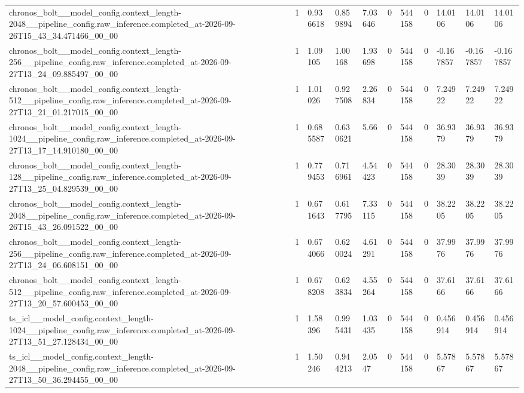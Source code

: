 \begin{tabular}{lllllllllll}
chronos\_bolt\_\_model\_config.context\_length-2048\_\_pipeline\_config.raw\_inference.completed\_at-2026-09-26T15\_43\_34.471466\_00\_00 & 1 & 0.936618 & 0.859894 & 7.03646 & 0 & 544158 & 0 & 14.0106 & 14.0106 & 14.0106 \\
chronos\_bolt\_\_model\_config.context\_length-256\_\_pipeline\_config.raw\_inference.completed\_at-2026-09-27T13\_24\_09.885497\_00\_00 & 1 & 1.09105 & 1.00168 & 1.93698 & 0 & 544158 & 0 & -0.167857 & -0.167857 & -0.167857 \\
chronos\_bolt\_\_model\_config.context\_length-512\_\_pipeline\_config.raw\_inference.completed\_at-2026-09-27T13\_21\_01.217015\_00\_00 & 1 & 1.01026 & 0.927508 & 2.26834 & 0 & 544158 & 0 & 7.24922 & 7.24922 & 7.24922 \\
chronos\_bolt\_\_model\_config.context\_length-1024\_\_pipeline\_config.raw\_inference.completed\_at-2026-09-27T13\_17\_14.910180\_00\_00 & 1 & 0.685587 & 0.630621 & 5.66 & 0 & 544158 & 0 & 36.9379 & 36.9379 & 36.9379 \\
chronos\_bolt\_\_model\_config.context\_length-128\_\_pipeline\_config.raw\_inference.completed\_at-2026-09-27T13\_25\_04.829539\_00\_00 & 1 & 0.779453 & 0.716961 & 4.54423 & 0 & 544158 & 0 & 28.3039 & 28.3039 & 28.3039 \\
chronos\_bolt\_\_model\_config.context\_length-2048\_\_pipeline\_config.raw\_inference.completed\_at-2026-09-26T15\_43\_26.091522\_00\_00 & 1 & 0.671643 & 0.617795 & 7.33115 & 0 & 544158 & 0 & 38.2205 & 38.2205 & 38.2205 \\
chronos\_bolt\_\_model\_config.context\_length-256\_\_pipeline\_config.raw\_inference.completed\_at-2026-09-27T13\_24\_06.608151\_00\_00 & 1 & 0.674066 & 0.620024 & 4.61291 & 0 & 544158 & 0 & 37.9976 & 37.9976 & 37.9976 \\
chronos\_bolt\_\_model\_config.context\_length-512\_\_pipeline\_config.raw\_inference.completed\_at-2026-09-27T13\_20\_57.600453\_00\_00 & 1 & 0.678208 & 0.623834 & 4.55264 & 0 & 544158 & 0 & 37.6166 & 37.6166 & 37.6166 \\
ts\_icl\_\_model\_config.context\_length-1024\_\_pipeline\_config.raw\_inference.completed\_at-2026-09-27T13\_51\_27.128434\_00\_00 & 1 & 1.58396 & 0.995431 & 1.03435 & 0 & 544158 & 0 & 0.456914 & 0.456914 & 0.456914 \\
ts\_icl\_\_model\_config.context\_length-2048\_\_pipeline\_config.raw\_inference.completed\_at-2026-09-27T13\_50\_36.294455\_00\_00 & 1 & 1.50246 & 0.944213 & 2.0547 & 0 & 544158 & 0 & 5.57867 & 5.57867 & 5.57867 \\

\end{tabular}
